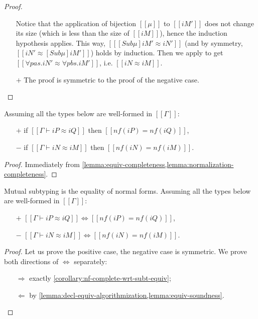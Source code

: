 \begin{proof}
\begin{itemize}
\begin{caseof}
      Notice that the application of bijection $[[μ]]$ to $[[iM']]$ does
      not change its size (which is less than the size of $[[iM]]$), hence the induction hypothesis applies.
      This way, $[[ [Sub μ]iM' ≈ iN']]$ (and by symmetry, $[[iN' ≈ [Sub μ]iM']]$) holds by induction. 
      Then we apply  to get $[[∀pas.iN' ≈ ∀pbs.iM']]$, i.e. $[[iN ≈ iM]]$.
    \end{caseof}
      
\item[$+$] The proof is symmetric to the proof of the negative case.
  \end{itemize}
\end{proof}

\begin{corollary}
  \label{corollary:nf-complete-wrt-subt-equiv}
  Assuming all the types below are well-formed in $[[Γ]]$:
  \begin{itemize}
    \item [$+$] if $[[Γ ⊢ iP ≈ iQ]]$ then $[[nf(iP) = nf(iQ)]]$,
    \item [$-$] if $[[Γ ⊢ iN ≈ iM]]$ then $[[nf(iN) = nf(iM)]]$.
  \end{itemize}
\end{corollary}  
\begin{proof}
  Immediately from \cref{lemma:equiv-completeness,lemma:normalization-completeness}.
\end{proof}

\begin{lemma}
  \label{lemma:subt-equiv-algorithmization}
  Mutual subtyping is the equality of normal forms.
 Assuming all the types below are well-formed in $[[Γ]]$:
  \begin{itemize}
    \item [$+$] $[[Γ ⊢ iP ≈ iQ]] \iff [[nf(iP) = nf(iQ)]]$,
    \item [$-$] $[[Γ ⊢ iN ≈ iM]] \iff [[nf(iN) = nf(iM)]]$.
  \end{itemize}
\end{lemma}
\begin{proof}
  Let us prove the positive case, the negative case is symmetric.
  We prove both directions of $\iff$ separately:
  \begin{itemize}
    \item [$\Rightarrow$] exactly \cref{corollary:nf-complete-wrt-subt-equiv};
    \item [$\Leftarrow$] by \cref{lemma:decl-equiv-algorithmization,lemma:equiv-soundness}.
  \end{itemize}
\end{proof}


